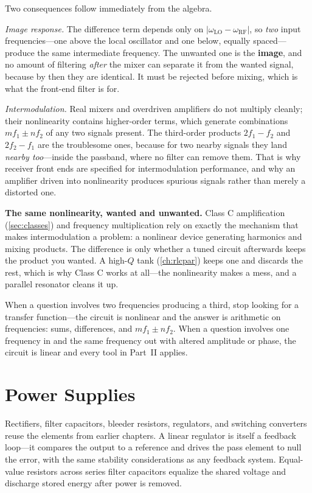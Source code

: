 Two consequences follow immediately from the algebra.

\emph{Image response.} The difference term depends only on
\(|\omega_{\text{LO}}-\omega_{\text{RF}}|\), so \emph{two} input frequencies---one
above the local oscillator and one below, equally spaced---produce the same
intermediate frequency. The unwanted one is the \textbf{image}, and no amount of
filtering \emph{after} the mixer can separate it from the wanted signal, because by
then they are identical. It must be rejected before mixing, which is what the front-end
filter is for.

\emph{Intermodulation.} Real mixers and overdriven amplifiers do not multiply cleanly;
their nonlinearity contains higher-order terms, which generate combinations
\(m f_1\pm n f_2\) of any two signals present. The third-order products
\(2f_1-f_2\) and \(2f_2-f_1\) are the troublesome ones, because for two nearby
signals they land \emph{nearby too}---inside the passband, where no filter can remove
them. That is why receiver front ends are specified for intermodulation
performance, and why an amplifier driven into nonlinearity produces spurious signals
rather than merely a distorted one.

\begin{physicalbox}
\textbf{The same nonlinearity, wanted and unwanted.} Class C amplification
(\cref{sec:classes}) and frequency multiplication rely on exactly the mechanism that
makes intermodulation a problem: a nonlinear device generating harmonics and mixing
products. The difference is only whether a tuned circuit afterwards keeps the product
you wanted. A high-\(Q\) tank (\cref{ch:rlcpar}) keeps one and discards the rest,
which is why Class C works at all---the nonlinearity makes a mess, and a parallel
resonator cleans it up.
\end{physicalbox}

\begin{exambox}
When a question involves two frequencies producing a third, stop looking for a
transfer function---the circuit is nonlinear and the answer is arithmetic on
frequencies: sums, differences, and \(mf_1\pm nf_2\). When a question involves one
frequency in and the same frequency out with altered amplitude or phase, the circuit
is linear and every tool in Part~II applies.
\end{exambox}

\section{Power Supplies}
Rectifiers, filter capacitors, bleeder resistors, regulators, and switching
converters reuse the elements from earlier chapters. A linear regulator is itself
a feedback loop---it compares the output to a reference and drives the pass
element to null the error, with the same stability considerations as any feedback
system. Equal-value resistors across series filter capacitors equalize the shared
voltage and discharge stored energy after power is removed.

